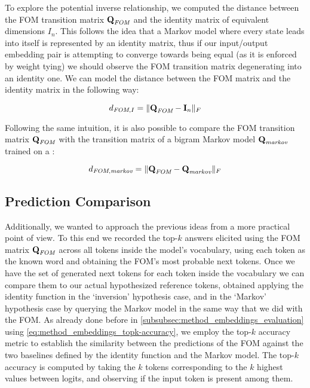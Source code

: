 To explore the potential inverse relationship, we computed the distance between the FOM transition matrix $\bm{\mathbf{Q}}_{\textit{FOM}}$ and the identity matrix of equivalent dimensions $I_n$.
This follows the idea that a Markov model where every state leads into itself is represented by an identity matrix, thus if our input/output embedding pair is attempting to converge towards being equal (as it is enforced by weight tying) we should observe the FOM transition matrix degenerating into an identity one.
We can model the distance between the FOM matrix and the identity matrix in the following way:

\begin{equation}
    \label{eq:method_fom_fom-i-comp}
    d_{\textit{FOM},I} = \| \bm{\mathbf{Q}}_{\textit{FOM}} - \bm{\mathbf{I}}_n \|_F
\end{equation}

Following the same intuition, it is also possible to compare the FOM transition matrix $\bm{\mathbf{Q}}_{\textit{FOM}}$ with the transition matrix of a bigram Markov model $\bm{\mathbf{Q}}_{\textit{markov}}$ trained on a :

\begin{equation}
    \label{eq:method_fom_fom-markov-comp}
    d_{\textit{FOM},\textit{markov}} = \| \bm{\mathbf{Q}}_{\textit{FOM}} - \bm{\mathbf{Q}}_{\textit{markov}} \|_F
\end{equation}

\subsection{Prediction Comparison}

Additionally, we wanted to approach the previous ideas from a more practical point of view.
To this end we recorded the top-$k$ answers elicited using the FOM matrix $\bm{\mathbf{Q}}_{\textit{FOM}}$ across all tokens inside the model's vocabulary, using each token as the known word and obtaining the FOM's most probable next tokens.
Once we have the set of generated next tokens for each token inside the vocabulary we can compare them to our actual hypothesized reference tokens, obtained applying the identity function in the `inversion' hypothesis case, and in the `Markov' hypothesis case by querying the Markov model in the same way that we did with the FOM.
As already done before in \cref{subsubsec:method_embeddings_evaluation} using \cref{eq:method_embeddings_topk-accuracy}, we employ the top-$k$ accuracy metric to establish the similarity between the predictions of the FOM against the two baselines defined by the identity function and the Markov model.
The top-$k$ accuracy is computed by taking the $k$ tokens corresponding to the $k$ highest values between logits, and observing if the input token is present among them.

